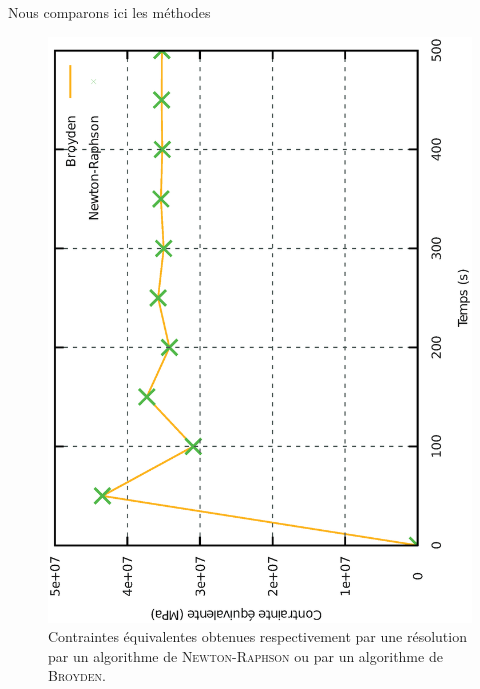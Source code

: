\documentclass[rectoverso,pleiades,pstricks,leqno,anti]{texmf/note_technique_2010}
\begin{document}

Nous comparons ici les méthodes 

\begin{figure}[htbp]
  \centering
  \includegraphics[height=0.8\linewidth,angle=-90]{Images/CompSeq.eps}
  \caption{Contraintes équivalentes obtenues respectivement par une
    résolution par un algorithme de \textsc{Newton-Raphson} ou par un
    algorithme de \textsc{Broyden}.}
  \label{fig:CompVMis}
\end{figure}
\end{document}

